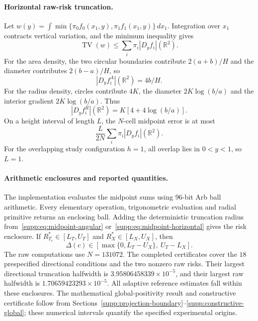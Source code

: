 \paragraph{Horizontal raw-risk truncation.}
Let $w(y)=\int\min\{\pi_0f_0(x_1,y),\pi_1f_1(x_1,y)\}\,dx_1$. Integration over $x_1$ contracts vertical variation, and the minimum inequality gives
\[
 \operatorname{TV}(w)\leq\sum_i\pi_i|D_yf_i|(\mathbb R^2).
\]
For the area density, the two circular boundaries contribute $2(a+b)/H$ and the diameter contributes $2(b-a)/H$, so
\begin{equation}
 |D_yf_i^A|(\mathbb R^2)=4b/H.
 \label{supp:eq:horizontal-bv-area}
\end{equation}
For the radius density, circles contribute $4K$, the diameter $2K\log(b/a)$ and the interior gradient $2K\log(b/a)$. Thus
\begin{equation}
 |D_yf_i^R|(\mathbb R^2)=K[4+4\log(b/a)].
 \label{supp:eq:horizontal-bv-radius}
\end{equation}
On a height interval of length $L$, the $N$-cell midpoint error is at most
\begin{equation}
 \frac{L}{2N}\sum_i\pi_i|D_yf_i|(\mathbb R^2).
 \label{supp:eq:midpoint-horizontal}
\end{equation}
For the overlapping study configuration $h=1$, all overlap lies in $0<y<1$, so $L=1$.

\paragraph{Arithmetic enclosures and reported quantities.}
The implementation evaluates the midpoint sums using 96-bit Arb ball arithmetic. Every elementary operation, trigonometric evaluation and radial primitive returns an enclosing ball. Adding the deterministic truncation radius from~\eqref{supp:eq:midpoint-angular} or~\eqref{supp:eq:midpoint-horizontal} gives the risk enclosure. If $R^*_{T_c}\in[L_T,U_T]$ and $R_X^*\in[L_X,U_X]$, then
\[
 \Delta(c)\in[\max\{0,L_T-U_X\},\ U_T-L_X].
\]
The raw computations use $N=131072$. The completed certificates cover the $18$ prespecified directional conditions and the two nonzero raw risks. Their largest directional truncation halfwidth is $3.95806458339\times10^{-5}$, and their largest raw halfwidth is $1.70659423293\times10^{-5}$. All adaptive reference estimates fall within these enclosures. The mathematical global-positivity result and constructive certificate follow from Sections~\ref{supp:projection-boundary}--\ref{supp:constructive-global}; these numerical intervals quantify the specified experimental origins.
